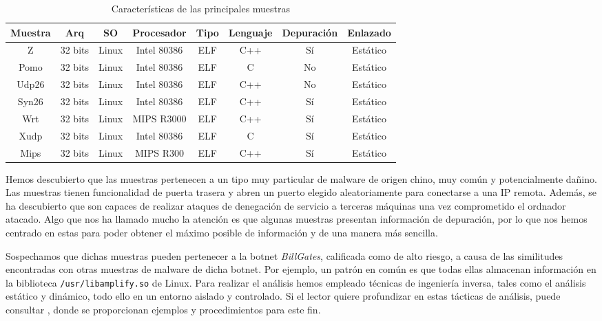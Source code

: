 \documentclass[journal]{IEEEtran}
\begin{document}
\begin{table}[H]
\centering
\begin{tabulary}{9.2cm}{| CCCCCCCC |}
\hline 
Muestra & Arq & SO  & Procesador & Tipo& Lenguaje & Depuración & Enlazado   \\ 
\hline 
Z & 32 bits & Linux & Intel 80386 & ELF & C++ & Sí & Estático\\ 
\hline 
Pomo & 32 bits & Linux  & Intel 80386 & ELF & C & No & Estático\\ 
\hline 
Udp26 & 32 bits & Linux & Intel 80386 & ELF & C++ & No & Estático\\ 
\hline 
Syn26 & 32 bits & Linux & Intel 80386 & ELF & C++ & Sí & Estático\\ 
\hline 
Wrt & 32 bits & Linux & MIPS R3000 & ELF & C++ & Sí & Estático\\ 
\hline 
Xudp & 32 bits & Linux & Intel 80386 & ELF & C & Sí & Estático\\ 
\hline 
Mips & 32 bits & Linux & MIPS R300 & ELF & C++ & Sí & Estático\\ 
\hline 
\end{tabulary}
\caption{Características de las principales muestras}
\end{table}
Hemos descubierto que las muestras pertenecen a un tipo muy particular de malware de origen chino, muy común y potencialmente dañino. Las muestras tienen funcionalidad de puerta trasera y abren un puerto elegido aleatoriamente para conectarse a una IP remota. Además, se ha descubierto que son capaces de realizar ataques de denegación de servicio a terceras máquinas una vez comprometido el ordnador atacado. Algo que nos ha llamado mucho la atención es que algunas muestras presentan información de depuración, por lo que nos hemos centrado en estas para poder obtener el máximo posible de información y de una manera más sencilla.

Sospechamos que dichas muestras pueden pertenecer a la botnet \textit{BillGates}, calificada como de alto riesgo, a causa de las similitudes encontradas con otras muestras de malware de dicha botnet. Por ejemplo, un patrón en común es que todas ellas almacenan información en la biblioteca {\tt /usr/libamplify.so} de Linux. Para realizar el análisis hemos empleado técnicas de ingeniería inversa, tales como el análisis estático y dinámico, todo ello en un entorno aislado y controlado. Si el lector quiere profundizar en estas tácticas de análisis, puede consultar \cite{honeywell2004know}, donde se proporcionan ejemplos y procedimientos para este fin.
\end{document}
